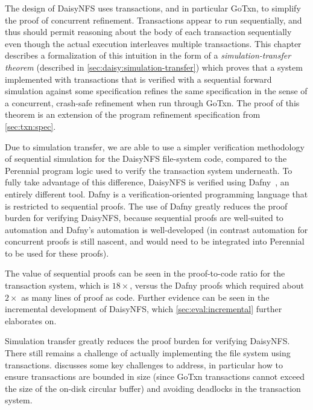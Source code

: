 The design of DaisyNFS uses transactions, and in particular GoTxn, to simplify
the proof of concurrent refinement. Transactions appear to run
sequentially, and thus should permit reasoning about the body of each
transaction sequentially even though the actual execution interleaves multiple
transactions. This chapter describes a formalization of this intuition in the
form of a \emph{simulation-transfer theorem} (described in
\cref{sec:daisy:simulation-transfer}) which proves that a system implemented
with transactions that is verified with a sequential forward simulation against
some specification refines the same specification in the sense of a concurrent,
crash-safe refinement when run through GoTxn. The proof of this theorem is an
extension of the program refinement specification from \cref{sec:txn:spec}.

Due to simulation transfer, we are able to use a simpler verification
methodology of sequential simulation for the DaisyNFS file-system code, compared
to the Perennial program logic used to verify the transaction system underneath.
To fully take advantage of this difference, DaisyNFS is verified using
Dafny~\cite{leino:dafny}, an entirely different tool. Dafny is a
verification-oriented programming language that is restricted to sequential
proofs. The use of Dafny greatly reduces the proof burden for verifying
DaisyNFS, because sequential proofs are well-suited to automation and Dafny's
automation is well-developed (in contrast automation for concurrent proofs is
still nascent, and would need to be integrated into Perennial to be used for
these proofs).

The value of sequential proofs can be seen in the proof-to-code ratio for the
transaction system, which is $18\times$, versus the Dafny proofs which required
about $2\times$ as many lines of proof as code. Further evidence can be seen in
the incremental development of DaisyNFS, which \cref{sec:eval:incremental}
further elaborates on.

Simulation transfer greatly reduces the proof burden for verifying DaisyNFS.
There still remains a challenge of actually implementing the file system using
transactions.  discusses some key challenges to address,
in particular how to ensure transactions are bounded in size (since GoTxn
transactions cannot exceed the size of the on-disk circular buffer) and avoiding
deadlocks in the transaction system.

